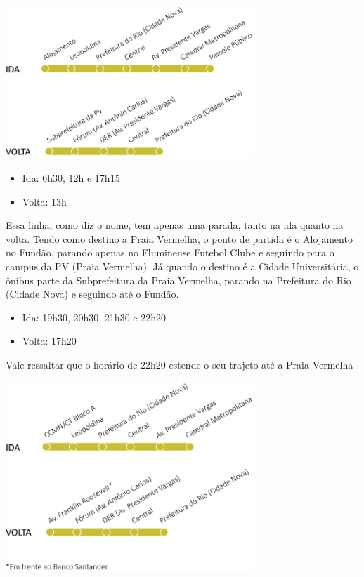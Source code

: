     \begin{center}
          \includegraphics[width=0.7\textwidth]{assets/esquematico_intercampi_pv_ufrj.png}
    \end{center} 
        
	\begin{itemize}
            \item [] Ida: 6h30, 12h e 17h15
            \item [] Volta: 13h    
      \end{itemize}
      Essa linha, como diz o nome, tem apenas uma parada, tanto na ida quanto na volta. Tendo como destino a Praia Vermelha, o ponto de partida é o Alojamento no Fundão, parando apenas no Fluminense Futebol Clube e seguindo para o campus da PV (Praia Vermelha). Já quando o destino é a Cidade Universitária, o ônibus parte da Subprefeitura da Praia Vermelha, parando na Prefeitura do Rio (Cidade Nova) e seguindo até o Fundão.

      \begin{itemize}
            \item [] Ida: 19h30, 20h30, 21h30 e 22h20
            \item [] Volta: 17h20    
      \end{itemize}
      Vale ressaltar que o horário de 22h20 estende o seu trajeto até a Praia Vermelha
      
      \begin{center}
          \includegraphics[width=0.7\textwidth]{assets/esquematico_intercampi_pracaXV_ufrj.png}
    \end{center} 
    
